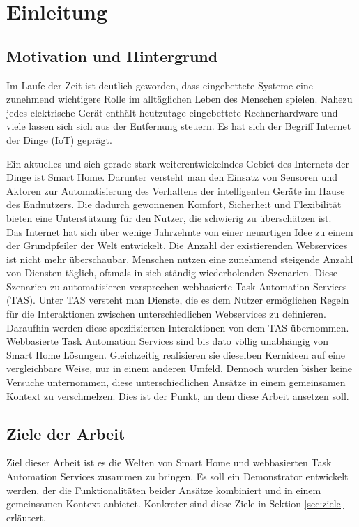 \chapter{Einleitung}
\section{Motivation und Hintergrund}
Im Laufe der Zeit ist deutlich geworden, dass eingebettete Systeme eine zunehmend wichtigere Rolle im alltäglichen Leben des Menschen spielen. Nahezu jedes elektrische Gerät enthält heutzutage eingebettete Rechnerhardware und viele lassen sich sich aus der Entfernung steuern. Es hat sich der Begriff Internet der Dinge (IoT) geprägt.

Ein aktuelles und sich gerade stark weiterentwickelndes Gebiet des Internets der Dinge ist Smart Home. Darunter versteht man den Einsatz von Sensoren und Aktoren zur Automatisierung des Verhaltens der intelligenten Geräte im Hause des Endnutzers. Die dadurch gewonnenen Komfort, Sicherheit und Flexibilität bieten eine Unterstützung für den Nutzer, die schwierig zu überschätzen ist. \\

Das Internet hat sich über wenige Jahrzehnte von einer neuartigen Idee zu einem der Grundpfeiler der Welt entwickelt. Die Anzahl der existierenden Webservices ist nicht mehr überschaubar. 
Menschen nutzen eine zunehmend steigende Anzahl von Diensten täglich, oftmals in sich ständig wiederholenden Szenarien. 
Diese Szenarien zu automatisieren versprechen webbasierte Task Automation Services (TAS). Unter TAS versteht man Dienste, die es dem Nutzer ermöglichen Regeln für die Interaktionen zwischen unterschiedlichen Webservices zu definieren. Daraufhin werden diese spezifizierten Interaktionen von dem TAS übernommen.\\

Webbasierte Task Automation Services sind bis dato völlig unabhängig von Smart Home Lösungen. Gleichzeitig realisieren sie dieselben Kernideen auf eine vergleichbare Weise, nur in einem anderen Umfeld. Dennoch wurden bisher keine Versuche unternommen, diese unterschiedlichen Ansätze in einem gemeinsamen Kontext zu verschmelzen. Dies ist der Punkt, an dem diese Arbeit ansetzen soll.


\section{Ziele der Arbeit}
Ziel dieser Arbeit ist es die Welten von Smart Home und webbasierten Task Automation Services zusammen zu bringen. Es soll ein Demonstrator entwickelt werden, der die  Funktionalitäten beider Ansätze kombiniert und in einem gemeinsamen Kontext anbietet. Konkreter sind diese Ziele in Sektion \ref{sec:ziele} erläutert.


